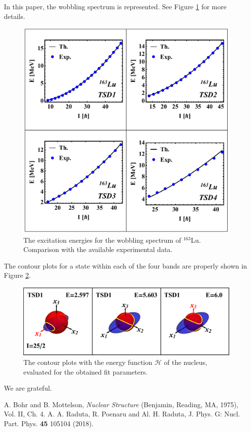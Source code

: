 \documentclass[myclassdoc,debug]{rjparticle}
\begin{document}
In this paper, the wobbling spectrum is represented. See Figure \ref{tsd_spectrum} for more details.

\begin{figure}[ht]
    \centering
    \includegraphics[scale=0.5]{simple-code/figs/ExcitationEnergies_GridView.pdf}
    \caption{The excitation energies for the wobbling spectrum of $^{163}$Lu. Comparison with the available experimental data.}
    \label{tsd_spectrum}
\end{figure}

The contour plots for a state within each of the four bands are properly shown in Figure \ref{contours}.

\begin{figure}[ht]
    \centering
    \includegraphics[scale=0.5]{simple-code/figs/tsd1_spin1.eps}
    \caption{The contour plots with the energy function $\mathcal{H}$ of the nucleus, evaluated for the obtained fit parameters.}
    \label{contours}
\end{figure}

\begin{acknowledgement}
We are grateful.
\end{acknowledgement}

\begin{thebibliography}{99}

A.  Bohr and B.  Mottelson, {\it Nuclear Structure} (Benjamin, Reading, MA, 1975), Vol.  II, Ch.  4. 
A.  A.  Raduta, R.  Poenaru and Al.  H.  Raduta, J.  Phys.  G: Nucl.  Part.  Phys.  {\bf 45} 105104 (2018). 

\end{thebibliography}
\end{document}
